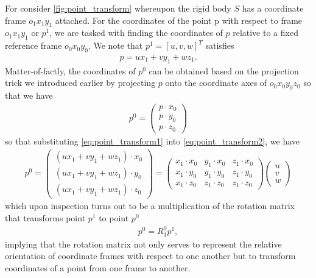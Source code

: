 For consider \autoref{fig:point_transform} whereupon the rigid body $S$ has a coordinate frame $o_1x_1y_1$ attached. For the coordinates of the point p with respect to frame $o_1x_1y_1$ or $p^1$, we are tasked with finding the coordinates of $p$ relative to a fixed reference frame $o_0x_0y_0$. We note that $p^1 = [u, v, w]^T$ satisfies 
%
\begin{align}
p = ux_1 + v y_1 + w z_1.
\label{eq:point_transform1}
\end{align}
%
Matter-of-factly, the coordinates of $p^0$ can be obtained based on the projection trick we introduced earlier by projecting $p$ onto the coordinate axes of $o_0x_0y_0z_0$ so that we have 
%
\begin{align}
p^0 = \left(\begin{array}{c}
p \cdot x_0 \\ p \cdot y_0 \\ p \cdot z_0
\end{array}\right)
\label{eq:point_transform2}
\end{align}
%
so that substituting \eqref{eq:point_transform1} into \eqref{eq:point_transform2}, we have
%
\begin{align}
p^0 = \left(\begin{array}{c}
(ux_1 + v y_1 + w z_1) \cdot x_0 \\ (ux_1 + v y_1 + w z_1) \cdot y_0 \\ (ux_1 + v y_1 + w z_1)  \cdot z_0
\end{array}\right)
%
= \left(\begin{array}{ccc}
x_1 \cdot x_0 & y_1 \cdot x_0 & z_1 \cdot x_0 \\
%
x_1 \cdot y_0 &  y_1 \cdot y_0 &  z_1 \cdot y_0\\ 
%
x_1  \cdot z_0 &  z_1  \cdot z_0 &  z_1  \cdot z_0
\end{array}\right) \left(\begin{array}{c}
u \\ v \\ w
\end{array}\right)
\label{eq:point_transform3}
\end{align}
%
which upon inspection turns out to be a multiplication of the rotation matrix that transforms point $p^1$ to point $p^0$ \ie
%
\begin{align}
p^0 = R_1^0 p^1,
\end{align}
%
implying that the rotation matrix not only serves to represent the relative orientation of coordinate frames with respect to one another but to transform coordinates of a point from one frame to another.


